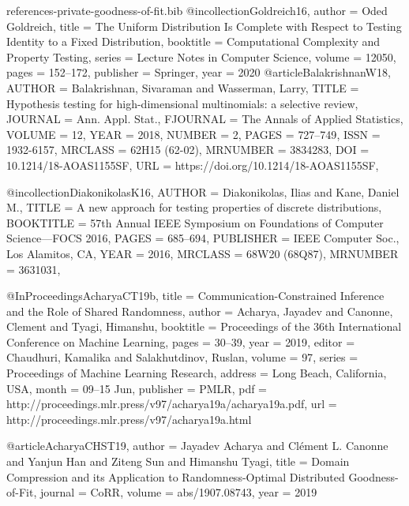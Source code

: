 \documentclass[10pt]{article}
\begin{document}
\begin{filecontents}{references-private-goodness-of-fit.bib}
@incollection{Goldreich16,
  author    = {Oded Goldreich},
  title     = {The Uniform Distribution Is Complete with Respect to Testing Identity
               to a Fixed Distribution},
  booktitle = {Computational Complexity and Property Testing},
  series    = {Lecture Notes in Computer Science},
  volume    = {12050},
  pages     = {152--172},
  publisher = {Springer},
  year      = {2020}
}
@article{BalakrishnanW18,
    AUTHOR = {Balakrishnan, Sivaraman and Wasserman, Larry},
     TITLE = {Hypothesis testing for high-dimensional multinomials: a
              selective review},
   JOURNAL = {Ann. Appl. Stat.},
  FJOURNAL = {The Annals of Applied Statistics},
    VOLUME = {12},
      YEAR = {2018},
    NUMBER = {2},
     PAGES = {727--749},
      ISSN = {1932-6157},
   MRCLASS = {62H15 (62-02)},
  MRNUMBER = {3834283},
       DOI = {10.1214/18-AOAS1155SF},
       URL = {https://doi.org/10.1214/18-AOAS1155SF},
}

@incollection{DiakonikolasK16,
    AUTHOR = {Diakonikolas, Ilias and Kane, Daniel M.},
     TITLE = {A new approach for testing properties of discrete
              distributions},
 BOOKTITLE = {57th {A}nnual {IEEE} {S}ymposium on {F}oundations of
              {C}omputer {S}cience---{FOCS} 2016},
     PAGES = {685--694},
 PUBLISHER = {IEEE Computer Soc., Los Alamitos, CA},
      YEAR = {2016},
   MRCLASS = {68W20 (68Q87)},
  MRNUMBER = {3631031},
}

@InProceedings{AcharyaCT19b,
  title = 	 {Communication-Constrained Inference and the Role of Shared Randomness},
  author = 	 {Acharya, Jayadev and Canonne, Clement and Tyagi, Himanshu},
  booktitle = 	 {Proceedings of the 36th International Conference on Machine Learning},
  pages = 	 {30--39},
  year = 	 {2019},
  editor = 	 {Chaudhuri, Kamalika and Salakhutdinov, Ruslan},
  volume = 	 {97},
  series = 	 {Proceedings of Machine Learning Research},
  address = 	 {Long Beach, California, USA},
  month = 	 {09--15 Jun},
  publisher = 	 {PMLR},
  pdf = 	 {http://proceedings.mlr.press/v97/acharya19a/acharya19a.pdf},
  url = 	 {http://proceedings.mlr.press/v97/acharya19a.html}
}

@article{AcharyaCHST19,
  author    = {Jayadev Acharya and
               Cl{\'{e}}ment L. Canonne and
               Yanjun Han and
               Ziteng Sun and
               Himanshu Tyagi},
  title     = {Domain Compression and its Application to Randomness-Optimal Distributed
               Goodness-of-Fit},
  journal   = {CoRR},
  volume    = {abs/1907.08743},
  year      = {2019}
}


\end{filecontents}
\end{document}
